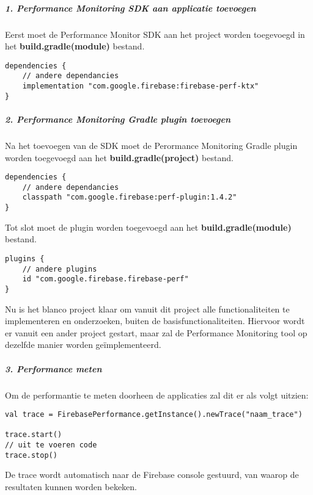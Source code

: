 \subparagraph{1. Performance Monitoring SDK aan applicatie toevoegen}
Eerst moet de Performance Monitor SDK aan het project worden toegevoegd in het \textbf{build.gradle(module)} bestand.
\begin{verbatim}
dependencies {
    // andere dependancies
    implementation "com.google.firebase:firebase-perf-ktx"
}
\end{verbatim}

\subparagraph{2. Performance Monitoring Gradle plugin toevoegen}
Na het toevoegen van de SDK moet de Perormance Monitoring Gradle plugin worden toegevoegd 
aan het \textbf{build.gradle(project)} bestand.
\begin{verbatim}
dependencies {
    // andere dependancies
    classpath "com.google.firebase:perf-plugin:1.4.2"
}
\end{verbatim}
Tot slot moet de plugin worden toegevoegd aan het \textbf{build.gradle(module)} bestand.
\begin{verbatim}
plugins {
    // andere plugins
    id "com.google.firebase.firebase-perf"
}
\end{verbatim}
Nu is het blanco project klaar om vanuit dit project alle functionaliteiten te 
implementeren en onderzoeken, buiten de basisfunctionaliteiten. Hiervoor wordt er vanuit een ander project gestart, 
maar zal de Performance Monitoring tool op dezelfde manier worden geïmplementeerd.

\subparagraph{3. Performance meten}
Om de performantie te meten doorheen de applicaties zal dit er als 
volgt uitzien:
\begin{verbatim}
val trace = FirebasePerformance.getInstance().newTrace("naam_trace")

trace.start()
// uit te voeren code
trace.stop()
\end{verbatim}
De trace wordt automatisch naar de Firebase console gestuurd, van waarop de 
resultaten kunnen worden bekeken.